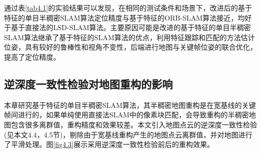 通过表\ref{tab4.1}的实验结果可以发现，在相同的测试条件和场景下，改进后的基于特征的单目半稠密SLAM算法定位精度与基于特征的ORB-SLAM算法接近，均好于基于直接法的LSD-SLAM算法。主要原因可能是改进的基于特征的单目半稠密SLAM算法继承了基于特征的SLAM算法的优点，利用特征跟踪和匹配的方法估计位姿，具有较好的鲁棒性和视角不变性，后端进行地图与关键帧位姿的联合优化，提高了定位精度。

\subsection{逆深度一致性检验对地图重构的影响}
本章研究基于特征的单目半稠密SLAM算法，其半稠密地图重构是在宽基线的关键帧间进行的，如果单纯使用直接法SLAM中的像素块匹配，会导致重构的半稠密地图包含很多离群值，重构精度和效果较差。本文引入地图点云的逆深度一致性检验(见本文4.4，4.5节)，剔除由于宽基线重构产生的地图点云离群值，并对地图进行了平滑处理。图\ref{fig4.3}展示采用逆深度一致性检验前后的重构效果。

